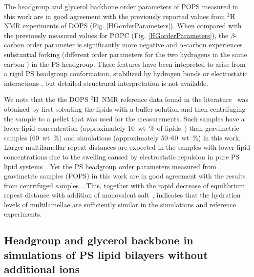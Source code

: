 \documentclass[aps,prl,superscriptaddress,twocolumn]{revtex4}
\begin{document}
The headgroup and glycerol backbone order parameters of 
POPS measured in this work are in good agreement with the previously reported
values from $^2$H\,NMR experiments of DOPS \cite{browning80} (Fig. \ref{HGorderParameters}).
When compared with the previously measured values for POPC \cite{ferreira13} (Fig. \ref{HGorderParameters}),
the $\beta$-carbon order parameter is significantly more negative and $\alpha$-carbon
experiences substantial forking (different order parameters for the two hydrogens in the same carbon \cite{ollila16}) in the PS headgroup.
These features have been intepreted to arise from a rigid PS headgroup
conformation, stabilized by hydrogen bonds or electrostatic
interactions \cite{browning80,buldt81}, but detailed structrural interpretation is not
available. 

We note that the the DOPS $^2$H~NMR reference data found in the literature~\cite{browning80,roux90} was obtained by first solvating
the lipids with a buffer solution and then centrifuging the sample to a pellet that was used for the measurements. Such samples have a lower lipid concentration
(approximately 10~wt~\% of lipids~\cite{browning80,roux88,roux90}) than 
gravimetric samples (60~wt~\%) and simulations (approximately 50--60~wt~\%) in this work.
Larger multilamellar repeat distances are expected in the samples with lower lipid
concentrations due to the swelling caused by electrostatic repulsion in pure PS lipid systems~\cite{millman82}.
Yet the PS headgroup order parameters measured from gravimetric samples (POPS) in this work
are in good agreement with the results from centrifuged samples~\cite{browning80}. This, together with the rapid decrease of equilibrium repeat distance with addition of monovalent salt~\cite{millman82,rand89}, indicates that the hydration levels of multilamellae are sufficiently similar in the simulations and reference experiments.


\subsection{Headgroup and glycerol backbone in simulations of PS lipid bilayers without additional ions}
\end{document}
